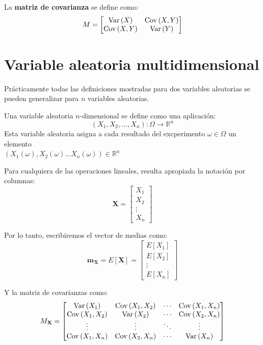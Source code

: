 \documentclass[a4paper]{book}
\renewcommand{\vec}[1]{\mathbf{#1}} %
\begin{document}
La \textbf{matriz de covarianza} se define como:
\[M=\left[ 
\begin{matrix}
	\operatorname{Var} \left( X \right)& \operatorname{Cov} \left( X,Y \right)\\ 
	\operatorname{Cov} \left( X,Y \right)& \operatorname{Var} \left( Y \right)
\end{matrix} \right]\]

\section{Variable aleatoria multidimensional}

Prácticamente todas las definiciones mostradas para dos variables aleatorias se pueden generalizar para $n$ variables aleatorias.

Una variable aleatoria $n$-dimensional se define como una aplicación:
\[\left( X_1,X_2,\dots , X_n \right):\Omega \longrightarrow \mathbb{R}^n\]
Esta variable aleatoria asigna a cada resultado del excperimento $\omega \in \Omega$ un elemento\\ $\left( X_1(\omega ), X_2(\omega ) \dots X_n (\omega )\right)\in \mathbb{R}^n$

Para cualquiera de las operaciones lineales, resulta apropiada la notación por columnas:
\[\vec{X} = \left[ 
\begin{matrix}
	X_1\\ 
	X_2\\ 
	\vdots \\ 
	X_n
\end{matrix} \right]\]

Por lo tanto, escribiremos el vector de medias como:
\[\vec{m}_{\vec{X}} = E \left[ \vec{X} \right]= \left[ 
\begin{matrix}
	E \left[ X_1 \right]\\ 
	E \left[ X_2 \right]\\ 
	\vdots \\ 
	E \left[ X_n \right]
\end{matrix} \right] \]

Y la matriz de covarianzas como:
\[ M_{\vec{X}} = \left[ 
\begin{matrix}
	\Var \left( X_1 \right) & \Cov \left( X_1, X_2 \right) & \cdots & \Cov \left( X_1, X_n \right)\\ 
	\Cov \left( X_1, X_2 \right) & \Var \left( X_2 \right) & \cdots & \Cov \left( X_2, X_n \right)\\ 
	\vdots & \vdots & \ddots & \vdots \\
	\Cov \left( X_1,X_n \right) & \Cov \left( X_2, X_n \right) & \cdots & \Var \left( X_n \right)
\end{matrix} \right]\]
\end{document}
